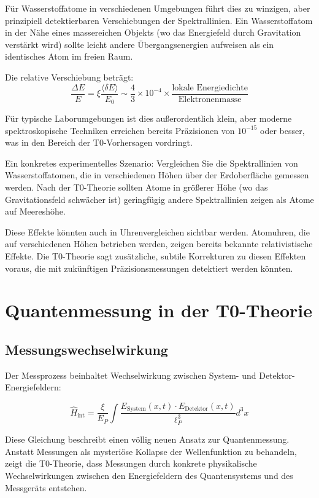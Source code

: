 \documentclass[12pt,a4paper]{article}
\newcommand{\deltaE}{\delta E}
\newcommand{\xipar}{\xi}
\newcommand{\EPlanck}{E_P}
\theoremstyle{definition}
\theoremstyle{remark}
\begin{document}
Für Wasserstoffatome in verschiedenen Umgebungen führt dies zu winzigen, aber prinzipiell detektierbaren Verschiebungen der Spektrallinien. Ein Wasserstoffatom in der Nähe eines massereichen Objekts (wo das Energiefeld durch Gravitation verstärkt wird) sollte leicht andere Übergangsenergien aufweisen als ein identisches Atom im freien Raum.

Die relative Verschiebung beträgt:
$$\frac{\Delta E}{E} = \xipar \frac{\langle \deltaE \rangle}{E_0} \sim \frac{4}{3} \times 10^{-4} \times \frac{\text{lokale Energiedichte}}{\text{Elektronenmasse}}$$

Für typische Laborumgebungen ist dies außerordentlich klein, aber moderne spektroskopische Techniken erreichen bereits Präzisionen von $10^{-15}$ oder besser, was in den Bereich der T0-Vorhersagen vordringt.

Ein konkretes experimentelles Szenario: Vergleichen Sie die Spektrallinien von Wasserstoffatomen, die in verschiedenen Höhen über der Erdoberfläche gemessen werden. Nach der T0-Theorie sollten Atome in größerer Höhe (wo das Gravitationsfeld schwächer ist) geringfügig andere Spektrallinien zeigen als Atome auf Meereshöhe.

Diese Effekte könnten auch in Uhrenvergleichen sichtbar werden. Atomuhren, die auf verschiedenen Höhen betrieben werden, zeigen bereits bekannte relativistische Effekte. Die T0-Theorie sagt zusätzliche, subtile Korrekturen zu diesen Effekten voraus, die mit zukünftigen Präzisionsmessungen detektiert werden könnten.

\section{Quantenmessung in der T0-Theorie}

\subsection{Messungswechselwirkung}

Der Messprozess beinhaltet Wechselwirkung zwischen System- und Detektor-Energiefeldern:

\begin{equation}
	\hat{H}_{\text{int}} = \frac{\xipar}{\EPlanck} \int \frac{E_{\text{System}}(x,t) \cdot E_{\text{Detektor}}(x,t)}{\ell_P^3} d^3x
	\label{eq:measurement_interaction}
\end{equation}

Diese Gleichung beschreibt einen völlig neuen Ansatz zur Quantenmessung. Anstatt Messungen als mysteriöse Kollapse der Wellenfunktion zu behandeln, zeigt die T0-Theorie, dass Messungen durch konkrete physikalische Wechselwirkungen zwischen den Energiefeldern des Quantensystems und des Messgeräts entstehen.
\end{document}
